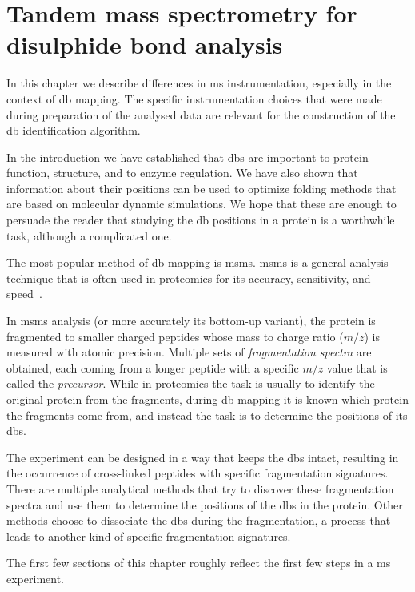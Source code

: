 \chapter{Tandem mass spectrometry for disulphide bond analysis}

In this chapter we describe differences in \gls*{ms} instrumentation, especially in the context of \gls*{db} mapping. The specific instrumentation choices that were made during preparation of the analysed data are relevant for the construction of the \gls*{db} identification algorithm.

In the introduction we have established that \glspl*{db} are important to protein function, structure, and to enzyme regulation. We have also shown that information about their positions can be used to optimize folding methods that are based on molecular dynamic simulations. We hope that these are enough to persuade the reader that studying the \gls*{db} positions in a protein is a worthwhile task, although a complicated one.

The most popular method of \gls*{db} mapping is \gls*{msms}. \gls*{msms} is a general analysis technique that is often used in proteomics for its accuracy, sensitivity, and speed~\cite{gorman2002protein}.

In \gls*{msms} analysis (or more accurately its bottom-up variant), the protein is fragmented to smaller charged peptides whose mass to charge ratio (\(m/z\)) is measured with atomic precision. Multiple sets of \emph{fragmentation spectra} are obtained, each coming from a longer peptide with a specific \(m/z\) value that is called the \emph{precursor}. While in proteomics the task is usually to identify the original protein from the fragments, during \gls*{db} mapping it is known which protein the fragments come from, and instead the task is to determine the positions of its \glspl*{db}.

The experiment can be designed in a way that keeps the \glspl*{db} intact, resulting in the occurrence of cross-linked peptides with specific fragmentation signatures. There are multiple analytical methods that try to discover these fragmentation spectra and use them to determine the positions of the \glspl*{db} in the protein. Other methods choose to dissociate the \glspl*{db} during the fragmentation, a process that leads to another kind of specific fragmentation signatures.

The first few sections of this chapter roughly reflect the first few steps in a \gls*{ms} experiment.

